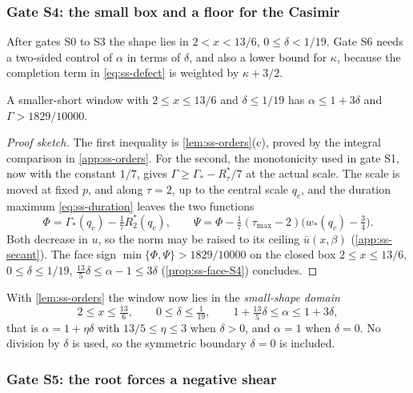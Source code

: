 \subsubsection{Gate S4: the small box and a floor for the Casimir}\label{sec:ss-S4}

After gates S0 to S3 the shape lies in $2<x<13/6$, $0\le\delta<1/19$. Gate S6 needs a two-sided
control of $\alpha$ in terms of $\delta$, and also a lower bound for $\kappa$, because the
completion term in \eqref{eq:ss-defect} is weighted by $\kappa+3/2$.

\begin{proposition}[Gate S4]\label{prop:ss-S4}
A smaller-short window with $2\le x\le13/6$ and $\delta\le1/19$ has $\alpha\le1+3\delta$ and
$\Gamma>1829/10000$.
\end{proposition}

\begin{proof}[Proof sketch]
The first inequality is \cref{lem:ss-orders}(c), proved by the integral comparison in
\cref{app:ss-orders}. For the second, the monotonicity used in gate S1, now with the constant $1/7$,
gives $\Gamma\ge\Gamma_*-R^*_\tau/7$ at the actual scale. The scale
is moved at fixed $p$, and along $\tau=2$, up to the central scale $q_c$, and the duration maximum
\eqref{eq:ss-duration} leaves the two functions
\[
  \Phi=\Gamma_*(q_c)-\tfrac17R^*_2(q_c),\qquad
  \Psi=\Phi-\tfrac17(\tau_{\max}-2)\bigl(w_*(q_c)-\tfrac34\bigr).
\]
Both decrease in $u$, so the norm may be raised to its ceiling $\bar u(x,\beta)$
(\cref{app:ss-secant}). The face sign $\min\{\Phi,\Psi\}>1829/10000$ on the closed box
$2\le x\le13/6$, $0\le\delta\le1/19$, $\frac{13}{5}\delta\le\alpha-1\le3\delta$
(\cref{prop:ss-face-S4}) concludes.
\end{proof}

With \cref{lem:ss-orders} the window now lies in the \emph{small-shape domain}
\begin{equation}\label{eq:ss-small}
  2\le x\le\tfrac{13}{6},\qquad 0\le\delta\le\tfrac1{19},\qquad
  1+\tfrac{13}{5}\delta\le\alpha\le1+3\delta,
\end{equation}
that is $\alpha=1+\eta\delta$ with $13/5\le\eta\le3$ when $\delta>0$, and $\alpha=1$ when
$\delta=0$. No division by $\delta$ is used, so the symmetric boundary $\delta=0$ is included.

\subsubsection{Gate S5: the root forces a negative shear}\label{sec:ss-S5}

